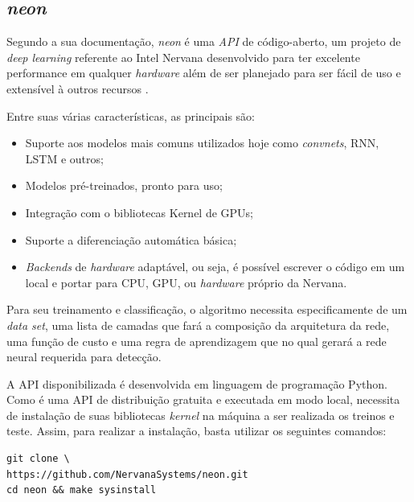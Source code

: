 \documentclass[10pt, conference]{IEEEtran}
\begin{document}
	\subsection{\textit{neon}} \label{sec:neon}
		Segundo a sua documentação, \textit{neon} é uma \textit{API} de código-aberto, um projeto de \textit{deep learning} referente ao Intel Nervana desenvolvido para ter excelente performance em qualquer \textit{hardware} além de ser planejado para ser fácil de uso e extensível à outros recursos \cite{neon}.

		Entre suas várias características, as principais são:

		\begin{itemize}
			\item Suporte aos modelos mais comuns utilizados hoje como \textit{convnets}, RNN, LSTM e outros;
			\item Modelos pré-treinados, pronto para uso;
			\item Integração com o bibliotecas Kernel de GPUs;
			\item Suporte a diferenciação automática básica;
			\item \textit{Backends} de \textit{hardware} adaptável, ou seja, é possível escrever o código em um local e portar para CPU, GPU, ou \textit{hardware} próprio da Nervana.
		\end{itemize}

		Para seu treinamento e classificação, o algoritmo necessita especificamente de um \textit{data set}, uma lista de camadas que fará a composição da arquitetura da rede, uma função de custo e uma regra de aprendizagem que no qual gerará a rede neural requerida para detecção.

		A API disponibilizada é desenvolvida em linguagem de programação Python. Como é uma API de distribuição gratuita e executada em modo local, necessita de instalação de suas bibliotecas \textit{kernel} na máquina a ser realizada os treinos e teste. Assim, para realizar a instalação, basta utilizar os seguintes comandos:

		\begin{verbatim}
git clone \
https://github.com/NervanaSystems/neon.git
cd neon && make sysinstall
		\end{verbatim}
\end{document}
